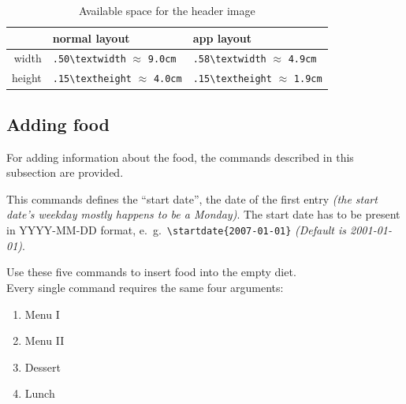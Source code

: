 \documentclass[11pt]{ltxdoc}
\begin{document}
	\begin{table}[b]\centering\sffamily\small\renewcommand{\arraystretch}{1.25}
		\begin{tabular}{r*{2}{|>{\centering\ttfamily}m{.25\textwidth}<{\arraybackslash}}}
			       & \textsf{normal layout}                                & app \textsf{layout}                                   \tabularnewline\hline\hline
			 width & \verb|.50\textwidth|  \newline $\approx$ \verb|9.0cm| & \verb|.58\textwidth|  \newline $\approx$ \verb|4.9cm| \tabularnewline\hline
			height & \verb|.15\textheight| \newline $\approx$ \verb|4.0cm| & \verb|.15\textheight| \newline $\approx$ \verb|1.9cm|
		\end{tabular}
	
		\rmfamily
		\caption{Available space for the header image}
		\label{tab:image-sizes}
	\end{table}
	
	
	\subsection{Adding food}
	For adding information about the food, the commands described in this subsection are provided.
	
	\medskip
	\DescribeMacro{\startdate}
	This commands defines the \enquote{start date}, the date of the first entry \textit{(the start date's weekday mostly happens to be a Monday)}. The start date has to be present in \textsf{YYYY-MM-DD} format, e.~g.~\verb|\startdate{2007-01-01}| \textit{(Default is 2001-01-01)}.
	
	\medskip
	\DescribeMacro{\monday}\DescribeMacro{\tuesday}\DescribeMacro{\wednesday}\DescribeMacro{\thursday}\DescribeMacro{\friday}
	Use these five commands to insert food into the empty diet. \\
	Every single command requires the same four arguments:
	\begin{multicols}{4}
		\begin{enumerate}\itemsep0pt
			\item Menu I
			\item Menu II
			\item Dessert
			\item Lunch
		\end{enumerate}
	\end{multicols}
\end{document}
